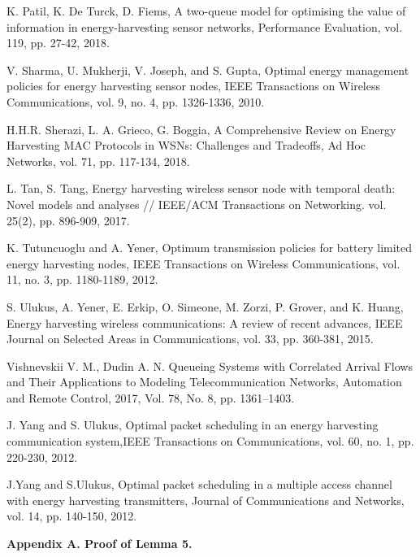 \documentclass[12pt, a4paper]{article}
\begin{document}
\begin{thebibliography}{8}
K. Patil, K. De Turck, D. Fiems,
A two-queue model for optimising the value of information in energy-harvesting sensor networks,
Performance Evaluation, vol. 119, pp. 27-42,  2018.

 V. Sharma, U. Mukherji, V. Joseph, and S. Gupta, Optimal energy management policies for energy harvesting sensor
nodes, IEEE Transactions on Wireless Communications, vol. 9, no. 4, pp. 1326-1336, 2010.

H.H.R. Sherazi, L. A. Grieco,  G. Boggia, A Comprehensive Review on Energy Harvesting MAC Protocols in WSNs: Challenges and Tradeoffs, Ad Hoc Networks, vol. 71, pp. 117-134, 2018.

L. Tan, S. Tang,  Energy harvesting wireless sensor node with temporal death: Novel models and analyses // IEEE/ACM Transactions on Networking. vol. 25(2), pp. 896-909, 2017.

K. Tutuncuoglu and A. Yener, Optimum transmission policies for battery limited energy harvesting nodes, IEEE Transactions
on Wireless Communications, vol. 11, no. 3, pp. 1180-1189, 2012.

S. Ulukus,  A. Yener, E. Erkip,   O. Simeone,  M. Zorzi,  P. Grover, and K. Huang,   Energy harvesting wireless communications: A review of recent advances, IEEE Journal on Selected Areas in Communications, vol. 33, pp. 360-381,  2015.



 Vishnevskii V. M.,   Dudin A. N. Queueing Systems with Correlated Arrival Flows
and Their Applications to Modeling Telecommunication Networks, Automation and Remote Control, 2017, Vol. 78, No. 8, pp. 1361–1403.

J. Yang and S. Ulukus, Optimal packet scheduling in an energy
harvesting communication system,IEEE Transactions on Communications, vol. 60, no. 1, pp. 220-230, 2012.

J.Yang and S.Ulukus, Optimal packet scheduling in a multiple
access channel with energy harvesting transmitters, Journal of
Communications and Networks, vol. 14, pp. 140-150, 2012.






\end{thebibliography}



{\bf Appendix A. Proof of Lemma 5.}
\end{document}
